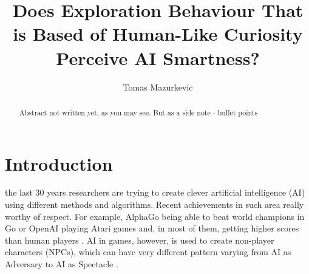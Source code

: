 \documentclass[journal]{IEEEtran}
\begin{document}
%
\title{Does Exploration Behaviour That is Based of Human-Like Curiosity Perceive AI Smartness?}
%
%
\author{Tomas Mazurkevic}


\maketitle

\begin{abstract}
Abstract not written yet, as you may see. But as a side note - bullet points 
\end{abstract}

\section{Introduction}
% 
% 
% 
% 
 the last 30 years researchers are trying to create clever artificial intelligence (AI) using different methods and algorithms. Recent achievements in such area really worthy of respect. For example, AlphaGo being able to beat world champions in Go \cite{alphago} or OpenAI playing Atari games and, in most of them, getting higher scores than human players \cite{mnih2015human}. AI in games, however, is used to create non-player characters (NPCs), which can have very different pattern varying from AI as Adversary to AI as Spectacle \cite{treanor2015ai}. 
\end{document}
